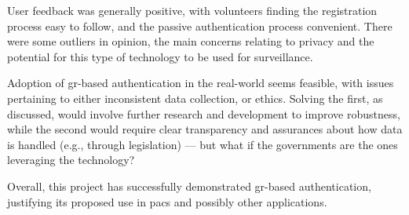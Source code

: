 User feedback was generally positive, with volunteers finding the registration process easy to follow, and the passive authentication process convenient.
There were some outliers in opinion, the main concerns relating to privacy and the potential for this type of technology to be used for surveillance.

Adoption of \ac{gr}-based authentication in the real-world seems feasible, with issues pertaining to either inconsistent data collection, or ethics.
Solving the first, as discussed, would involve further research and development to improve robustness, while the second would require clear transparency and assurances about how data is handled (e.g., through legislation) --- but what if the governments are the ones leveraging the technology?

Overall, this project has successfully demonstrated \ac{gr}-based authentication, justifying its proposed use in \ac{pacs} and possibly other applications.








